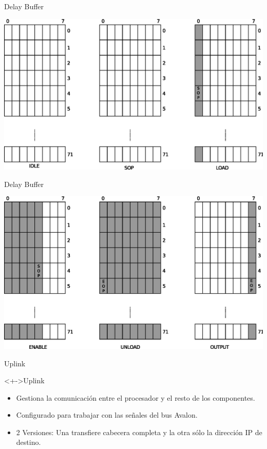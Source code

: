 \documentclass[xcolor=dvipsnames]{beamer}
\begin{document}
\begin{frame}{Delay Buffer}

\center 

\includegraphics[scale=0.50]{figures/regdespl01.eps}

\end{frame}

\begin{frame}{Delay Buffer}

\center 

\includegraphics[scale=0.50]{figures/regdespl02.eps}

\end{frame}

\begin{frame}{Uplink}
 \begin{block}<+->{Uplink}
	\begin{itemize}
      \scriptsize
	\item Gestiona la comunicación entre el procesador y el resto de los componentes.
	\item Configurado para trabajar con las señales del bus Avalon.
	\item 2 Versiones: Una transfiere cabecera completa y la otra sólo la dirección IP de destino.
	
	   \end{itemize}
\end{block}
\end{frame}
\end{document}
